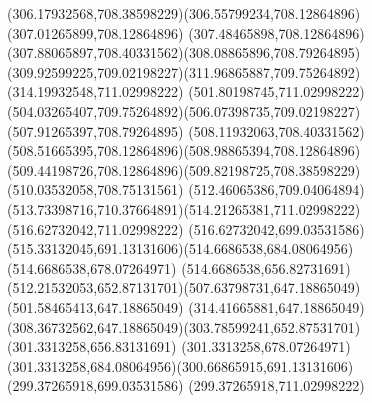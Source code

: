 {{\curveto(306.17932568,708.38598229)(306.55799234,708.12864896)(307.01265899,708.12864896)
\curveto(307.48465898,708.12864896)(307.88065897,708.40331562)(308.08865896,708.79264895)
\curveto(309.92599225,709.02198227)(311.96865887,709.75264892)(314.19932548,711.02998222)
\lineto(501.80198745,711.02998222)
\curveto(504.03265407,709.75264892)(506.07398735,709.02198227)(507.91265397,708.79264895)
\curveto(508.11932063,708.40331562)(508.51665395,708.12864896)(508.98865394,708.12864896)
\curveto(509.44198726,708.12864896)(509.82198725,708.38598229)(510.03532058,708.75131561)
\curveto(512.46065386,709.04064894)(513.73398716,710.37664891)(514.21265381,711.02998222)
\lineto(516.62732042,711.02998222)
\lineto(516.62732042,699.03531586)
\curveto(515.33132045,691.13131606)(514.6686538,684.08064956)(514.6686538,678.07264971)
\lineto(514.6686538,656.82731691)
\curveto(512.21532053,652.87131701)(507.63798731,647.18865049)(501.58465413,647.18865049)
\lineto(314.41665881,647.18865049)
\curveto(308.36732562,647.18865049)(303.78599241,652.87531701)(301.3313258,656.83131691)
\lineto(301.3313258,678.07264971)
\curveto(301.3313258,684.08064956)(300.66865915,691.13131606)(299.37265918,699.03531586)
\lineto(299.37265918,711.02998222)
\closepath
}
}
{
}
